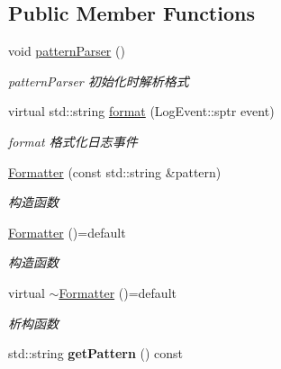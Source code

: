 \subsection*{Public Member Functions}
\begin{DoxyCompactItemize}
\item 
\mbox{\label{classdaq_1_1Formatter_ac2ae2c7b79e090d996b1a6c8491d4cfd}} 
void \hyperlink{classdaq_1_1Formatter_ac2ae2c7b79e090d996b1a6c8491d4cfd}{pattern\+Parser} ()
\begin{DoxyCompactList}\small\item\em pattern\+Parser 初始化时解析格式 \end{DoxyCompactList}\item 
virtual std\+::string \hyperlink{classdaq_1_1Formatter_ab060743da2f5e48c5021b10dfc3439d3}{format} (Log\+Event\+::sptr event)
\begin{DoxyCompactList}\small\item\em format 格式化日志事件 \end{DoxyCompactList}\item 
\hyperlink{classdaq_1_1Formatter_a62bedb8ff686edc0e19c1b6d9130e354}{Formatter} (const std\+::string \&pattern)
\begin{DoxyCompactList}\small\item\em 构造函数 \end{DoxyCompactList}\item 
\mbox{\label{classdaq_1_1Formatter_aeb73224a684f226d46092536d7e20edd}} 
\hyperlink{classdaq_1_1Formatter_aeb73224a684f226d46092536d7e20edd}{Formatter} ()=default
\begin{DoxyCompactList}\small\item\em 构造函数 \end{DoxyCompactList}\item 
\mbox{\label{classdaq_1_1Formatter_a5dd988fb194686310100a722f1bb4a92}} 
virtual \hyperlink{classdaq_1_1Formatter_a5dd988fb194686310100a722f1bb4a92}{$\sim$\+Formatter} ()=default
\begin{DoxyCompactList}\small\item\em 析构函数 \end{DoxyCompactList}\item 
\mbox{\label{classdaq_1_1Formatter_ab329d883433a924780a4e424c4539e99}} 
std\+::string {\bfseries get\+Pattern} () const
\end{DoxyCompactItemize}
